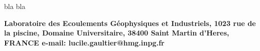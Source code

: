 \documentclass[portrait,a0b,final]{a0poster}
\newenvironment{poster}{
  \begin{center}
  \begin{minipage}[c]{1.0\textwidth}
}{
  \end{minipage} 
  \end{center}
}
\newcommand{\pbox}[4]{
         \psshadowbox[#3]{
            \begin{minipage}[t][#2][t]{#1} #4
            \end{minipage}
         }
}
\begin{document}
\begin{poster}
\begin{multicols}{2}
\begin{center}
{{ bla bla
 
 
 }
 }
 \end{center}

 
 
 {\tiny
 
 
 }
 
 
\end{multicols}
\begin{center}
 
  {\bf Laboratoire des Ecoulements G\'eophysiques et Industriels, 
1023 rue de la piscine, Domaine Universitaire, 38400 Saint Martin d'Heres, FRANCE 
e-mail: lucile.gaultier@hmg.inpg.fr}
\end{center}
 
\end{poster}
\end{document}
